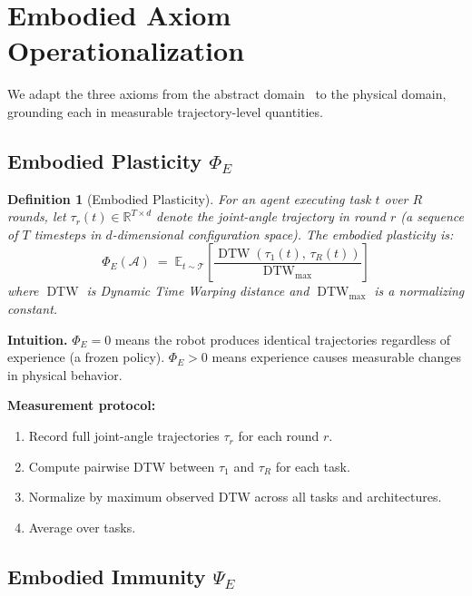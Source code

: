\documentclass{article}
\newtheorem{definition}{Definition}
\newcommand{\cA}{\mathcal{A}}
\newcommand{\cT}{\mathcal{T}}
\newcommand{\R}{\mathbb{R}}
\newcommand{\E}{\mathbb{E}}
\DeclareMathOperator{\DTW}{DTW}
\begin{document}
\section{Embodied Axiom Operationalization}
\label{sec:axioms}

We adapt the three axioms from the abstract domain~\citep{sovereign2026p4} to the physical domain, grounding each in measurable trajectory-level quantities.

\subsection{Embodied Plasticity $\Phi_E$}

\begin{definition}[Embodied Plasticity]
For an agent executing task $t$ over $R$ rounds, let $\tau_r(t) \in \R^{T \times d}$ denote the joint-angle trajectory in round $r$ (a sequence of $T$ timesteps in $d$-dimensional configuration space).
The \emph{embodied plasticity} is:
\begin{equation}
    \Phi_E(\cA) \;=\; \E_{t \sim \cT}\left[\frac{\DTW(\tau_1(t),\, \tau_R(t))}{\DTW_{\max}}\right]
\end{equation}
where $\DTW$ is Dynamic Time Warping distance and $\DTW_{\max}$ is a normalizing constant.
\end{definition}

\textbf{Intuition.} $\Phi_E = 0$ means the robot produces identical trajectories regardless of experience (a frozen policy). $\Phi_E > 0$ means experience causes measurable changes in physical behavior.

\textbf{Measurement protocol:}
\begin{enumerate}[itemsep=1pt]
    \item Record full joint-angle trajectories $\tau_r$ for each round $r$.
    \item Compute pairwise DTW between $\tau_1$ and $\tau_R$ for each task.
    \item Normalize by maximum observed DTW across all tasks and architectures.
    \item Average over tasks.
\end{enumerate}

\subsection{Embodied Immunity $\Psi_E$}
\end{document}
